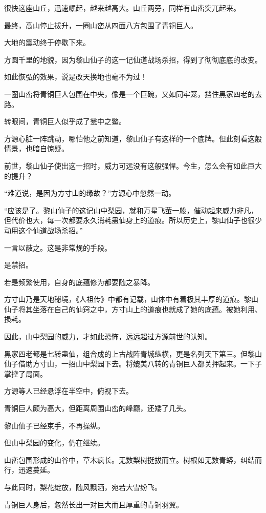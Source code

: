 \begin{this_body}
很快这座山丘，迅速崛起，越来越高大。山丘两旁，同样有山峦突兀起来。

最终，高山停止拔升，一圈山峦从四面八方包围了青铜巨人。

大地的震动终于停歇下来。

方圆千里的地貌，因为黎山仙子的这一记仙道战场杀招，得到了彻彻底底的改变。

如此恢弘的效果，说是改天换地也毫不为过！

一圈山峦将青铜巨人包围在中央，像是一个巨碗，又如同牢笼，挡住黑家四老的去路。

转眼间，青铜巨人似乎成了瓮中之鳖。

方源心脏一阵跳动，哪怕他之前知道，黎山仙子有这样的一个底牌。但此刻看这般情景，也暗自惊疑。

前世，黎山仙子使出这一招时，威力可远没有这般强悍。今生，怎么会有如此巨大的提升？

“难道说，是因为方寸山的缘故？”方源心中忽然一动。

“应该是了。黎山仙子的这记山中梨园，就和万星飞萤一般，催动起来威力非凡，但代价也大，每一次都要永久消耗蛊仙身上的道痕。所以历史上，黎山仙子也很少动用这个仙道战场杀招。”

一言以蔽之。这是非常规的手段。

是禁招。

若是频繁使用，自身的底蕴修为都要随之暴降。

方寸山乃是天地秘境，《人祖传》中都有记载，山体中有着极其丰厚的道痕。黎山仙子将其坐落在自己的仙窍之中，方寸山上的道痕也就成了她的底蕴。被她利用、损耗。

因此，山中梨园的威力，才如此恐怖，远远超过方源前世的认知。

黑家四老都是七转蛊仙，组合成的上古战阵青城纵横，更是名列天下第三。但黎山仙子借助方寸山，一招山中梨园下去。将媲美八转的青铜巨人都关押起来。一下子掌控了局面。

方源等人已经悬浮在半空中，俯视下去。

青铜巨人颇为高大，但距离周围山峦的峰巅，还矮了几头。

黎山仙子已经束手，不再操纵。

但山中梨园的变化，仍在继续。

山峦包围形成的山谷中，草木疯长。无数梨树挺拔而立。树根如无数青蟒，纠结而行，迅速蔓延。

与此同时，梨花绽放，随风飘洒，宛若大雪纷飞。

青铜巨人身后，忽然长出一对巨大而且厚重的青铜羽翼。


\end{this_body}
